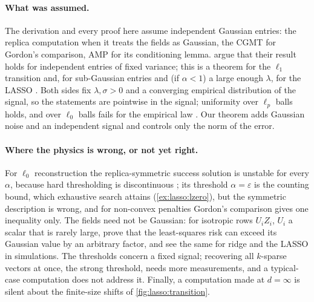 \begin{refsection}
\paragraph{What was assumed.} The derivation and every proof here assume independent Gaussian entries: the replica computation when it treats the fields as Gaussian, the CGMT for Gordon's comparison, AMP for its conditioning lemma. \Textcite{KabashimaEtAl2009} argue that their result holds for independent entries of fixed variance; this is a theorem for the $\ell_1$ transition \parencite{BayatiLelargeMontanari2015} and, for sub-Gaussian entries and (if $\alpha<1$) a large enough $\lambda$, for the LASSO \parencite{HanShen2023}. Both sides fix $\lambda,\sigma>0$ and a converging empirical distribution of the signal, so the statements are pointwise in the signal; uniformity over $\ell_p$ balls holds, and over $\ell_0$ balls fails for the empirical law \parencite[Remark~2]{MiolaneMontanari2021}. Our theorem adds Gaussian noise and an independent signal and controls only the norm of the error.

\paragraph{Where the physics is wrong, or not yet right.} For $\ell_0$ reconstruction the replica-symmetric success solution is unstable for every $\alpha$, because hard thresholding is discontinuous \parencite[\S4.1]{KabashimaEtAl2009}; its threshold $\alpha=\varepsilon$ is the counting bound, which exhaustive search attains (\cref{ex:lasso:lzero}), but the symmetric description is wrong, and for non-convex penalties Gordon's comparison gives one inequality only. The fields need not be Gaussian: for isotropic rows $U_iZ_i$, $U_i$ a scalar that is rarely large, \textcite{HanShen2023} prove that the least-squares risk can exceed its Gaussian value by an arbitrary factor, and see the same for ridge and the LASSO in simulations. The thresholds concern a fixed signal; recovering all $k$-sparse vectors at once, the strong threshold, needs more measurements, and a typical-case computation does not address it. Finally, a computation made at $d=\infty$ is silent about the finite-size shifts of \cref{fig:lasso:transition}.


\end{refsection}
